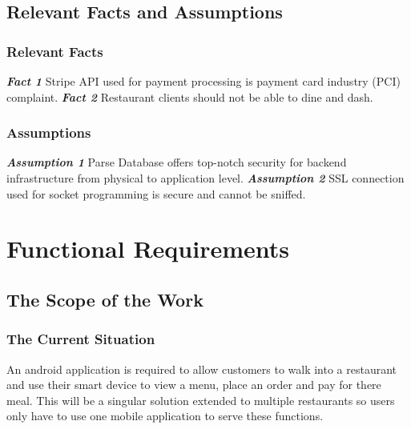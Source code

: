 \documentclass[12pt, titlepage]{article}
\begin{document}
\subsection{Relevant Facts and Assumptions} 
\subsubsection{Relevant Facts}
\textbf{\textit{Fact 1}}\newline
Stripe API used for payment processing is payment card industry (PCI) complaint.
\newline\newline
\textbf{\textit{Fact 2}}\newline
Restaurant clients should not be able to dine and dash.\newline

\subsubsection{Assumptions}

\textbf{\textit{Assumption  1}}\newline
Parse Database offers top-notch security for backend infrastructure from physical to application level.
\newline\newline
\textbf{\textit{Assumption  2}}\newline
SSL connection used for socket programming is secure and cannot be sniffed.

\section{Functional Requirements} 

\subsection{The Scope of the Work}
\subsubsection{The Current Situation}
An android application is required to allow customers to walk into a restaurant and use their smart device to view a menu, place an order and pay for there meal. This will be a singular solution extended to multiple restaurants so users only have to use one mobile application to serve these functions.   
\end{document}
